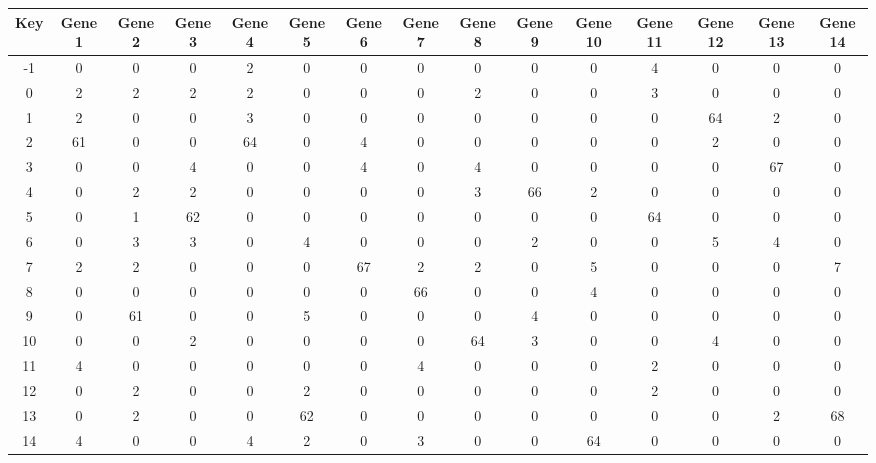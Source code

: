 \begin{tabular}{|c|c|c|c|c|c|c|c|c|c|c|c|c|c|c|}
\hline
Key & Gene 1 & Gene 2 & Gene 3 & Gene 4 & Gene 5 & Gene 6 & Gene 7 & Gene 8 & Gene 9 & Gene 10 & Gene 11 & Gene 12 & Gene 13 & Gene 14 \\
\hline
-1 & 0 & 0 & 0 & 2 & 0 & 0 & 0 & 0 & 0 & 0 & 4 & 0 & 0 & 0 \\
0 & 2 & 2 & 2 & 2 & 0 & 0 & 0 & 2 & 0 & 0 & 3 & 0 & 0 & 0 \\
1 & 2 & 0 & 0 & 3 & 0 & 0 & 0 & 0 & 0 & 0 & 0 & 64 & 2 & 0 \\
2 & 61 & 0 & 0 & 64 & 0 & 4 & 0 & 0 & 0 & 0 & 0 & 2 & 0 & 0 \\
3 & 0 & 0 & 4 & 0 & 0 & 4 & 0 & 4 & 0 & 0 & 0 & 0 & 67 & 0 \\
4 & 0 & 2 & 2 & 0 & 0 & 0 & 0 & 3 & 66 & 2 & 0 & 0 & 0 & 0 \\
5 & 0 & 1 & 62 & 0 & 0 & 0 & 0 & 0 & 0 & 0 & 64 & 0 & 0 & 0 \\
6 & 0 & 3 & 3 & 0 & 4 & 0 & 0 & 0 & 2 & 0 & 0 & 5 & 4 & 0 \\
7 & 2 & 2 & 0 & 0 & 0 & 67 & 2 & 2 & 0 & 5 & 0 & 0 & 0 & 7 \\
8 & 0 & 0 & 0 & 0 & 0 & 0 & 66 & 0 & 0 & 4 & 0 & 0 & 0 & 0 \\
9 & 0 & 61 & 0 & 0 & 5 & 0 & 0 & 0 & 4 & 0 & 0 & 0 & 0 & 0 \\
10 & 0 & 0 & 2 & 0 & 0 & 0 & 0 & 64 & 3 & 0 & 0 & 4 & 0 & 0 \\
11 & 4 & 0 & 0 & 0 & 0 & 0 & 4 & 0 & 0 & 0 & 2 & 0 & 0 & 0 \\
12 & 0 & 2 & 0 & 0 & 2 & 0 & 0 & 0 & 0 & 0 & 2 & 0 & 0 & 0 \\
13 & 0 & 2 & 0 & 0 & 62 & 0 & 0 & 0 & 0 & 0 & 0 & 0 & 2 & 68 \\
14 & 4 & 0 & 0 & 4 & 2 & 0 & 3 & 0 & 0 & 64 & 0 & 0 & 0 & 0 \\
\hline
\end{tabular}